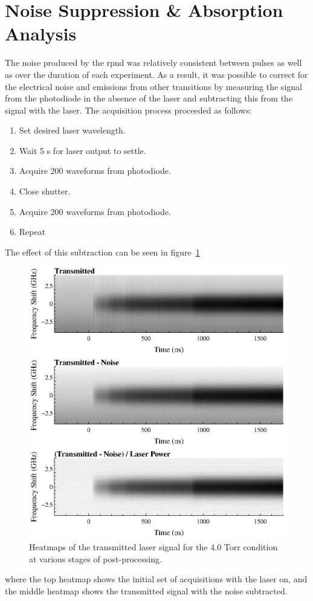 \section{Noise Suppression \& Absorption Analysis}

The noise produced by the \acs{rpnd} was relatively consistent between pulses as
well as over the duration of each experiment. As a result, it was possible to
correct for the electrical noise and emissions from other transitions by
measuring the signal from the photodiode in the absence of the laser and
subtracting this from the signal with the laser. The acquisition process
proceeded as follows:
\begin{enumerate}
  \singlespacing
  \item Set desired laser wavelength.
  \item Wait 5 s for laser output to settle.
  \item Acquire 200 waveforms from photodiode.
  \item Close shutter.
  \item Acquire 200 waveforms from photodiode.
  \item Repeat
\end{enumerate}
The effect of this subtraction can be seen in figure~\ref{fig:contours}
\begin{figure}
  \centering
  \includegraphics{./chapters/metastables/figures/contours.eps}
  \caption{Heatmaps of the transmitted laser signal for the 4.0 Torr condition at 
  various stages of post-processing.}
  \label{fig:contours}
\end{figure}
where the top heatmap shows the initial set of acquisitions with the laser on,
and the middle heatmap shows the transmitted signal with the noise subtracted.

